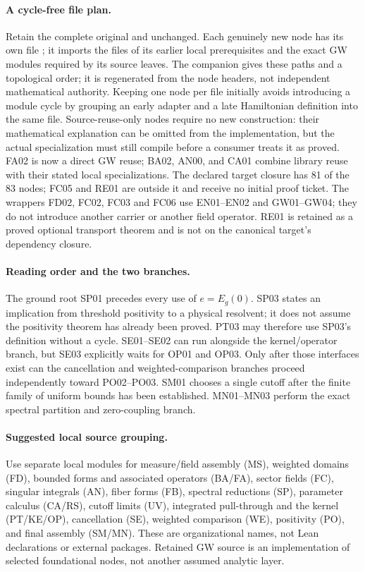 \documentclass[11pt,a4paper]{article}
\theoremstyle{remark}\newtheorem{remark}[theorem]{Remark}
\begin{document}
\paragraph{A cycle-free file plan.}
Retain the complete original  and  unchanged. Each genuinely new node has its own file ; it imports the files of its earlier local prerequisites and the exact GW modules required by its source leaves. The companion  gives these paths and a topological order; it is regenerated from the node headers, not independent mathematical authority. Keeping one node per file initially avoids introducing a module cycle by grouping an early adapter and a late Hamiltonian definition into the same file. Source-reuse-only nodes require no new construction: their mathematical explanation can be omitted from the implementation, but the actual specialization must still compile before a consumer treats it as proved. FA02 is now a direct GW reuse; BA02, AN00, and CA01 combine library reuse with their stated local specializations. The declared target closure has 81 of the 83 nodes; FC05 and RE01 are outside it and receive no initial proof ticket. The wrappers FD02, FC02, FC03 and FC06 use EN01--EN02 and GW01--GW04; they do not introduce another carrier or another field operator. RE01 is retained as a proved optional transport theorem and is not on the canonical target's dependency closure.

\paragraph{Reading order and the two branches.}
The ground root SP01 precedes every use of $e=E_g(0)$. SP03 states an implication from threshold positivity to a physical resolvent; it does not assume the positivity theorem has already been proved. PT03 may therefore use SP03's definition without a cycle. SE01--SE02 can run alongside the kernel/operator branch, but SE03 explicitly waits for OP01 and OP03. Only after those interfaces exist can the cancellation and weighted-comparison branches proceed independently toward PO02--PO03. SM01 chooses a single cutoff after the finite family of uniform bounds has been established. MN01--MN03 perform the exact spectral partition and zero-coupling branch.

\paragraph{Suggested local source grouping.}
Use separate local modules for measure/field assembly (MS), weighted domains (FD), bounded forms and associated operators (BA/FA), sector fields (FC), singular integrals (AN), fiber forms (FB), spectral reductions (SP), parameter calculus (CA/RS), cutoff limits (UV), integrated pull-through and the kernel (PT/KE/OP), cancellation (SE), weighted comparison (WE), positivity (PO), and final assembly (SM/MN). These are organizational names, not Lean declarations or external packages. Retained GW source is an implementation of selected foundational nodes, not another assumed analytic layer.
\end{document}
